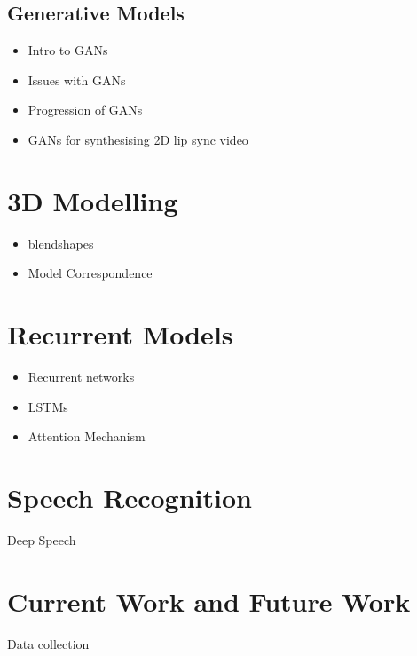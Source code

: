 \documentclass[12pt]{article}
\begin{document}
\subsection{Generative Models}
\begin{itemize}
    \item Intro to GANs
    \item Issues with GANs
    \item Progression of GANs
    \item GANs for synthesising 2D lip sync video
\end{itemize}

\section{3D Modelling}
\begin{itemize}
    \item blendshapes
    \item Model Correspondence
\end{itemize}

\section{Recurrent Models}
\begin{itemize}
    \item Recurrent networks
    \item LSTMs
    \item Attention Mechanism
\end{itemize}

\section{Speech Recognition}
Deep Speech

\section{Current Work and Future Work}
Data collection



\end{document}
